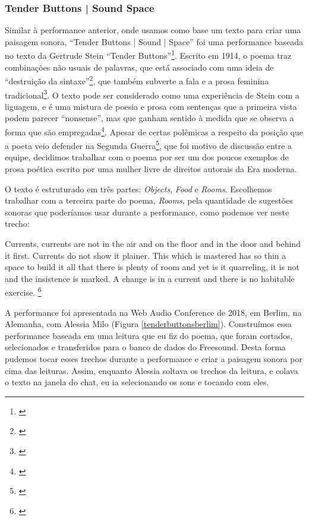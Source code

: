 \subsubsection{Tender Buttons | Sound Space}
Similar à performance anterior, onde usamos como base um texto para criar uma paisagem sonora, ``Tender Buttons | Sound | Space''  foi uma performance baseada no texto da Gertrude Stein ``Tender Buttons''\footnote{\cite{Stein1914}}. Escrito em 1914, o poema traz combinações não usuais de palavras, que está associado com uma ideia de ``destruição da sintaxe''\footnote{\cite{Perloff1996}}, que também subverte a fala e a prosa feminina tradicional\footnote{\cite{Murphy1991}}. O texto pode ser considerado como uma experiência de Stein com a liguagem, e é uma mistura de poesia e prosa com sentenças que a primeira vista podem parecer ``nonsense'', mas que ganham sentido à medida que se observa a forma que são empregadas\footnote{\cite{Perloff1996}}. Apesar de certas polêmicas a respeito da posição que a poeta veio defender na Segunda Guerra\footnote{\cite{Bernstein2012}}, que foi motivo de discussão entre a equipe, decidimos trabalhar com o poema por ser um dos poucos exemplos de prosa poética escrito por uma mulher livre de direitos autorais da Era moderna.

O texto é estruturado em três partes: \textit{Objects}, \textit{Food} e \textit{Rooms}. Escolhemos trabalhar com a terceira parte do poema, \textit{Rooms}, pela quantidade de sugestões sonoras que poderíamos usar durante a performance, como podemos ver neste trecho:

\begin{citacao}
Currents, currents are not in the air and on the floor and in the door and behind it first. Currents do not show it plainer. This which is mastered has so thin a space to build it all that there is plenty of room and yet is it quarreling, it is not and the insistence is marked. A change is in a current and there is no habitable exercise. \footnote{\cite{Stein1914}}
\end{citacao} 

A performance foi apresentada na Web Audio Conference de 2018, em Berlim, na Alemanha, com Alessia Milo (Figura \ref{tenderbuttonsberlim}). Construímos essa performance baseada em uma leitura que eu fiz do poema, que foram cortados, selecionados e transferidos para o banco de dados do Freesound. Desta forma pudemos tocar esses trechos durante a performance e criar a paisagem sonora por cima das leituras. Assim, enquanto Alessia soltava os trechos da leitura, e colava o texto na janela do chat, eu ia selecionando os sons e tocando com eles. 

